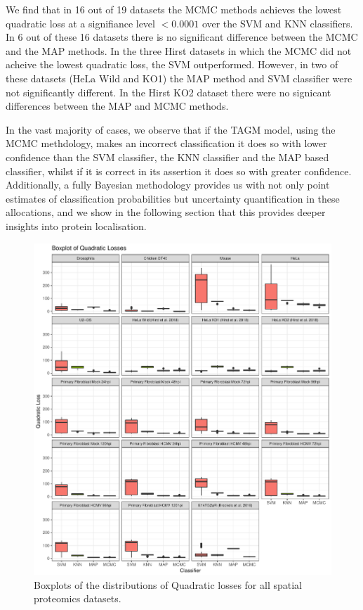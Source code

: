 \documentclass[12pt,english]{article}\usepackage[]{graphicx}\usepackage[]{color}
\makeatletter
\def\maxwidth{ %
  \ifdim\Gin@nat@width>\linewidth
    \linewidth
  \else
    \Gin@nat@width
  \fi
}
\newenvironment{knitrout}{}{} %
\makeatother
\begin{document}
We find that in 16 out of 19 datasets the MCMC methods achieves the
lowest quadratic loss at a signifiance level $<0.0001$ over the SVM
and KNN classifiers. In 6 out of these 16 datasets there is no
significant difference between the MCMC and the MAP methods. In the
three Hirst datasets in which the MCMC did not acheive the lowest
quadratic loss, the SVM outperformed. However, in two of these
datasets (HeLa Wild and KO1) the MAP method and SVM classifier were
not significantly different. In the Hirst KO2 dataset there were no
signicant differences between the MAP and MCMC methods.

In the vast majority of cases, we observe that if the TAGM model,
using the MCMC methdology, makes an incorrect classification it does
so with lower confidence than the SVM classifier, the KNN classifier
and the MAP based classifier, whilst if it is correct in its assertion
it does so with greater confidence. Additionally, a fully Bayesian
methodology provides us with not only point estimates of
classification probabilities but uncertainty quantification in these
allocations, and we show in the following section that this provides
deeper insights into protein localisation.



\begin{figure}[ht]
  \centering
\begin{knitrout}
\color{fgcolor}
\includegraphics[width=\maxwidth]{figure/quadboxplots-1} 

\end{knitrout}
\caption{Boxplots of the distributions of Quadratic losses for all
  spatial proteomics datasets.}
  \label{figure::quadloss}
\end{figure}
\end{document}
